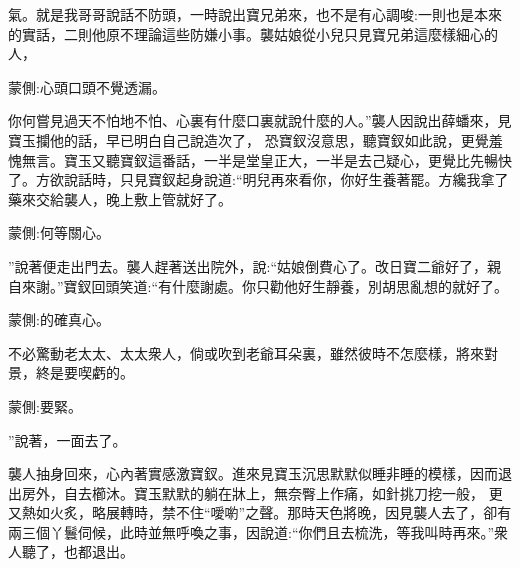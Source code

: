 \begin{parag}
氣。就是我哥哥說話不防頭，一時說出寶兄弟來，也不是有心調唆:一則也是本來的實話，二則他原不理論這些防嫌小事。襲姑娘從小兒只見寶兄弟這麼樣細心的人，\begin{note}蒙側:心頭口頭不覺透漏。\end{note}你何嘗見過天不怕地不怕、心裏有什麼口裏就說什麼的人。”襲人因說出薛蟠來，見寶玉攔他的話，早已明白自己說造次了， 恐寶釵沒意思，聽寶釵如此說，更覺羞愧無言。寶玉又聽寶釵這番話，一半是堂皇正大，一半是去己疑心，更覺比先暢快了。方欲說話時，只見寶釵起身說道:“明兒再來看你，你好生養著罷。方纔我拿了藥來交給襲人，晚上敷上管就好了。\begin{note}蒙側:何等關心。\end{note}”說著便走出門去。襲人趕著送出院外，說:“姑娘倒費心了。改日寶二爺好了，親自來謝。”寶釵回頭笑道:“有什麼謝處。你只勸他好生靜養，別胡思亂想的就好了。\begin{note}蒙側:的確真心。\end{note}不必驚動老太太、太太衆人，倘或吹到老爺耳朵裏，雖然彼時不怎麼樣，將來對景，終是要喫虧的。\begin{note}蒙側:要緊。\end{note}”說著，一面去了。
\end{parag}


\begin{parag}
    襲人抽身回來，心內著實感激寶釵。進來見寶玉沉思默默似睡非睡的模樣，因而退出房外，自去櫛沐。寶玉默默的躺在牀上，無奈臀上作痛，如針挑刀挖一般， 更又熱如火炙，略展轉時，禁不住“噯喲”之聲。那時天色將晚，因見襲人去了，卻有兩三個丫鬟伺候，此時並無呼喚之事，因說道:“你們且去梳洗，等我叫時再來。”衆人聽了，也都退出。
\end{parag}


